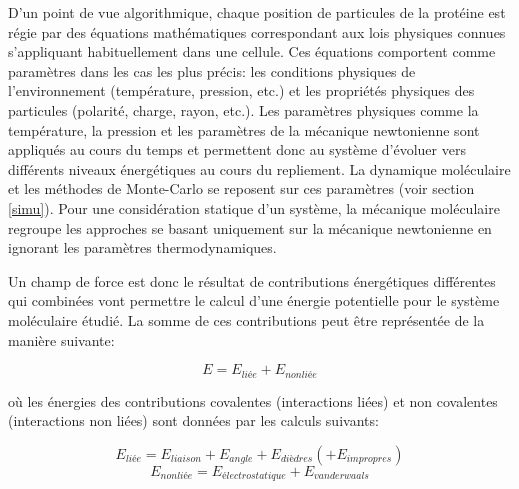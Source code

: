 D'un point de vue algorithmique, chaque position de particules de la protéine est régie par des équations mathématiques correspondant aux lois physiques connues s'appliquant habituellement dans une cellule. Ces équations comportent comme paramètres dans les cas les plus précis: les conditions physiques de l'environnement (température, pression, etc.) et les propriétés physiques des particules (polarité, charge, rayon, etc.). Les paramètres physiques comme la température, la pression et les paramètres de la mécanique newtonienne sont appliqués au cours du temps et permettent donc au système d'évoluer vers différents niveaux énergétiques au cours du repliement. La dynamique moléculaire et les méthodes de Monte-Carlo se reposent sur ces paramètres (voir section \ref{simu}). 
Pour une considération statique d'un système, la mécanique moléculaire regroupe les approches se basant uniquement sur la mécanique newtonienne en ignorant les paramètres thermodynamiques.

Un champ de force est donc le résultat de contributions énergétiques différentes qui combinées vont permettre le calcul d'une énergie potentielle pour le système moléculaire étudié. La somme de ces contributions peut  être représentée de la manière suivante:

$$E = E_{liée} + E_{nonliée}$$

où les énergies des contributions covalentes (interactions liées) et non covalentes (interactions non liées) sont données par les calculs suivants:

$$E_{liée} = E_{liaison} + E_{angle} + E_{dièdres} (+ E_{impropres})$$
$$E_{nonliée} = E_{électrostatique} + E_{vanderwaals}$$

